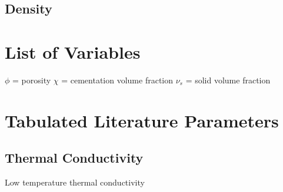 \documentclass[11pt]{article} %
\begin{document}
\begin{itemize}
\subsection{Density}

\section{List of Variables}
$\phi$ = porosity
$\chi$ = cementation volume fraction
$\nu_{s}$ = solid volume fraction

\section{Tabulated Literature Parameters}
\label{sec:tabulated}
	
\subsection{Thermal Conductivity}
\label{sec:tconductivity}
	
	Low temperature thermal conductivity
	

\end{itemize}
\end{document}
